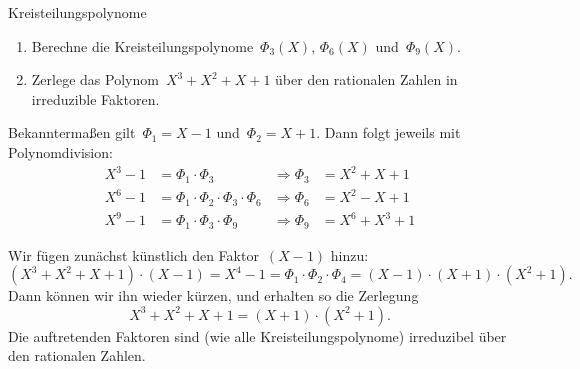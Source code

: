 \documentclass{algblatt}
\begin{document}
\begin{aufgabe}{Kreisteilungspolynome}
\begin{enumerate}
\item Berechne die Kreisteilungspolynome~$\Phi_3(X)$, $\Phi_6(X)$
und~$\Phi_9(X)$.

\item Zerlege das Polynom~$X^3 + X^2 + X + 1$ über den rationalen Zahlen
in irreduzible Faktoren.
\end{enumerate}

\begin{loesungE}
\item Bekanntermaßen gilt~$\Phi_1 = X - 1$ und~$\Phi_2 = X + 1$. Dann folgt
jeweils mit Polynomdivision:
\begin{align*}
  X^3 - 1 &= \Phi_1 \cdot \Phi_3
    & \Longrightarrow \Phi_3 &= X^2 + X + 1 \\
  X^6 - 1 &= \Phi_1 \cdot \Phi_2 \cdot \Phi_3 \cdot \Phi_6
    & \Longrightarrow \Phi_6 &= X^2 - X + 1 \\
  X^9 - 1 &= \Phi_1 \cdot \Phi_3 \cdot \Phi_9
    & \Longrightarrow \Phi_9 &= X^6 + X^3 + 1
\end{align*}

\item Wir fügen zunächst künstlich den Faktor~$(X-1)$ hinzu:
\[ (X^3 + X^2 + X + 1) \cdot (X-1) =
  X^4 - 1 = \Phi_1 \cdot \Phi_2 \cdot \Phi_4 =
  (X-1) \cdot (X+1) \cdot (X^2+1). \]
Dann können wir ihn wieder kürzen, und erhalten so die Zerlegung
\[ X^3 + X^2 + X + 1 = (X+1) \cdot (X^2 + 1). \]
Die auftretenden Faktoren sind (wie alle Kreisteilungspolynome) irreduzibel
über den rationalen Zahlen.
\end{loesungE}
\end{aufgabe}
\end{document}
